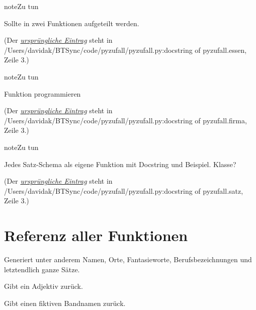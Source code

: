 \documentclass[a4paper,12pt,oneside]{sphinxmanual}
\begin{document}
\begin{notice}{note}{Zu tun}

Sollte in zwei Funktionen aufgeteilt werden.
\end{notice}

(Der {\hyperref[funktionen:index-0]{\emph{ursprüngliche Eintrag}}} steht in /Users/davidak/BTSync/code/pyzufall/pyzufall.py:docstring of pyzufall.essen, Zeile 3.)

\begin{notice}{note}{Zu tun}

Funktion programmieren
\end{notice}

(Der {\hyperref[funktionen:index-1]{\emph{ursprüngliche Eintrag}}} steht in /Users/davidak/BTSync/code/pyzufall/pyzufall.py:docstring of pyzufall.firma, Zeile 3.)

\begin{notice}{note}{Zu tun}

Jedes Satz-Schema als eigene Funktion mit Docstring und Beispiel. Klasse?
\end{notice}

(Der {\hyperref[funktionen:index-2]{\emph{ursprüngliche Eintrag}}} steht in /Users/davidak/BTSync/code/pyzufall/pyzufall.py:docstring of pyzufall.satz, Zeile 3.)


\chapter{Referenz aller Funktionen}
\label{funktionen:referenz-aller-funktionen}\label{funktionen::doc}\label{funktionen:module-pyzufall}
Generiert unter anderem Namen, Orte, Fantasieworte, Berufsbezeichnungen und letztendlich ganze Sätze.

\begin{fulllineitems}
\label{funktionen:pyzufall.adjektiv}
Gibt ein Adjektiv zurück.

\end{fulllineitems}


\begin{fulllineitems}
\label{funktionen:pyzufall.band}
Gibt einen fiktiven Bandnamen zurück.

\end{fulllineitems}
\end{document}
